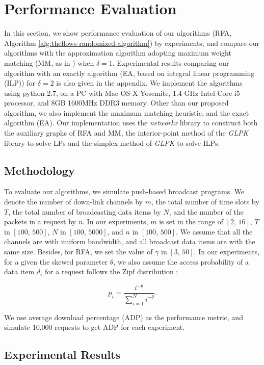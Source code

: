 \documentclass[11pt,english,onecolumn,draftcls]{IEEEtran}
\theoremstyle{plain}
\theoremstyle{plain}
\theoremstyle{plain}
\theoremstyle{plain}
\begin{document}
\section{Performance Evaluation}

In this section, we show performance evaluation of our algorithms
(RFA, Algorithm \ref{alg:theflows-randomized-algorithm}) by experiments,
and compare our algorithms with the approximation algorithm adopting
maximum weight matching (MM, as in \cite{Infocom12LuEfficient}) when
$\delta=1$. Experimental results comparing our algorithm with an
exactly algorithm (EA, based on integral linear programming (ILP))
for $\delta=2$ is also given in the appendix. We implement the algorithms
using python 2.7, on a PC with Mac OS X Yosemite, 1.4 GHz Intel Core
i5 processor, and 8GB 1600MHz DDR3 memory. Other than our proposed
algorithm, we also implement the maximum matching heuristic, and the
exact algorithm (EA). Our implementation uses the \emph{networkx}
library to construct both the auxiliary graphs of RFA and MM, the
interior-point method of the \emph{GLPK} library to solve LPs and
the simplex method of \emph{GLPK }to\emph{ }solve ILPs.


\subsection{Methodology}

To evaluate our algorithms, we simulate push-based broadcast programs.
We denote the number of down-link channels by $m$, the total number
of time slots by $T$, the total number of broadcasting data items
by $N$, and the number of the packets in a request by $n$. In our
experiments, $m$ is set in the range of $[2,\,16]$, $T$ in $[100,\,500]$,
$N$ in $[100,\,5000]$, and $n$ in $[100,\,500]$. We assume that
all the channels are with uniform bandwidth, and all broadcast data
items are with the same size. Besides, for RFA, we set the value of
$\gamma$ in $[3,\,50]$. In our experiments, for a given the skewed
parameter $\theta$, we also assume the access probability of a data
item $d_{i}$ for a request follows the Zipf distribution :

\[
p_{i}=\frac{i^{-\theta}}{\sum_{i=1}^{N}i^{-\theta}}.
\]


We use average download percentage (ADP) as the performance metric,
and simulate 10,000 requests to get ADP for each experiment.


\subsection{Experimental Results }
\end{document}
